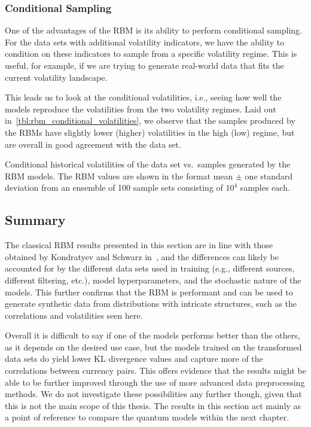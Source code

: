 \subsubsection{Conditional Sampling}
One of the advantages of the RBM is its ability to perform conditional sampling.
For the data sets with additional volatility indicators, we have the ability to condition on these indicators to sample from a specific volatility regime.
This is useful, for example, if we are trying to generate real-world data that fits the current volatility landscape.

This leads us to look at the conditional volatilities, i.e., seeing how well the models reproduce the volatilities from the two volatility regimes.
Laid out in~\cref{tbl:rbm_conditional_volatilities}, we observe that the samples produced by the RBMs have slightly lower (higher) volatilities in the high (low) regime, but are overall in good agreement with the data set.
\begin{table}[!htb]
    \centering
    \begin{adjustbox}{max width=\textwidth}
        
    \end{adjustbox}
    \caption{Conditional historical volatilities of the data set vs.~samples generated by the RBM models. The RBM values are shown in the format mean \(\pm\) one standard deviation from an ensemble of 100 sample sets consisting of \( 10^4 \) samples each.}
    \label{tbl:rbm_conditional_volatilities}
\end{table}

\subsection{Summary}
The classical RBM results presented in this section are in line with those obtained by Kondratyev and Schwarz in~\cite{kondratyev_2019}, and the differences can likely be accounted for by the different data sets used in training (e.g., different sources, different filtering, etc.), model hyperparameters, and the stochastic nature of the models.
This further confirms that the RBM is performant and can be used to generate synthetic data from distributions with intricate structures, such as the correlations and volatilities seen here.

Overall it is difficult to say if one of the models performs better than the others, as it depends on the desired use case, but the models trained on the transformed data sets do yield lower KL divergence values and capture more of the correlations between currency pairs.
This offers evidence that the results might be able to be further improved through the use of more advanced data preprocessing methods.
We do not investigate these possibilities any further though, given that this is not the main scope of this thesis.
The results in this section act mainly as a point of reference to compare the quantum models within the next chapter.
